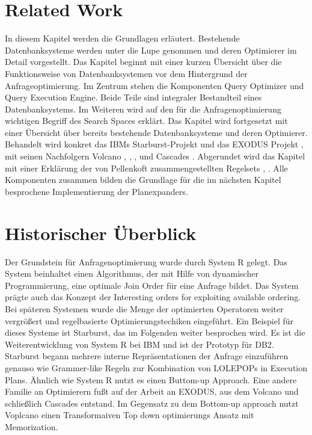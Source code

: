 \section{Related Work}

In diesem Kapitel werden die Grundlagen erläutert. Bestehende Datenbanksysteme werden unter die Lupe genommen und deren Optimierer im Detail vorgestellt. Das Kapitel beginnt mit einer kurzen Übersicht über die Funktionsweise von Datenbanksystemen vor dem Hintergrund der Anfrageoptimierung. Im Zentrum stehen die Komponenten Query Optimizer und Query Execution Engine. Beide Teile sind integraler Bestandteil eines Datenbanksystems. Im Weiteren wird auf den für die Anfragenoptimierung wichtigen Begriff des Search Spaces erklärt. Das Kapitel wird fortgesetzt mit einer Übersicht über bereits bestehende Datenbanksysteme und deren Optimierer. Behandelt wird konkret das IBMs Starburst-Projekt und das EXODUS Projekt \cite{graefe1987exodus}, \cite{carey1990exodus} mit seinen Nachfolgern Volcano \cite{graefe1990parallelizing}, \cite{graefe1990encapsulation}, \cite{graefe1993volcano}, \cite{graefe1994volcano} und Cascades \cite{graefe1995cascades}. Abgerundet wird das Kapitel mit einer Erklärung der von Pellenkoft zusammengestellten Regelsets \cite{pellenkoft1997complexity}, \cite{pellenkoft1997duplicate}. Alle Komponenten zusammen bilden die Grundlage für die im nächsten Kapitel besprochene Implementierung der Planexpanders.


\section{Historischer Überblick}
Der Grundstein für Anfragenoptimierung wurde durch System R gelegt. Das System beinhaltet einen Algorithmus, der mit Hilfe von dynamischer Programmierung, eine optimale Join Order für eine Anfrage bildet. Das System prägte auch das Konzept der Interesting orders for exploiting available ordering. Bei späteren Systemen  wurde die Menge der optimierten Operatoren weiter vergrößert und regelbasierte Optimierungstechiken eingeführt. Ein Beispiel für dieses Systeme ist Starburst, das im Folgenden weiter besprochen wird. Es ist die Weiterentwicklung von System R bei IBM und ist der Prototyp für DB2. Starburst begann mehrere interne Repräsentationen der Anfrage einzuführen genauso wie Grammer-like Regeln zur Kombination von LOLEPOPs in Execution Plans. Ähnlich wie System R nutzt es einen Buttom-up Approach. Eine andere Familie an Optimierern fußt auf der Arbeit an EXODUS, aus dem Volcano und schließlich Cascades entstand. Im Gegensatz zu dem Bottom-up approach nutzt Voplcano einen Transformaiven Top down optimierungs Ansatz mit Memorization. 

